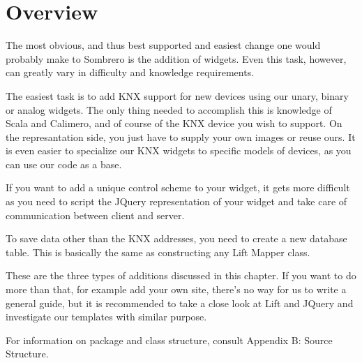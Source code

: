 \section{Overview}

The most obvious, and thus best supported and easiest change one would probably make to Sombrero is the addition of widgets. Even this task, however, can greatly vary in difficulty and knowledge requirements.

The easiest task is to add KNX support for new devices using our unary, binary or analog widgets. The only thing needed to accomplish this is knowledge of Scala and Calimero, and of course of the KNX device you wish to support. On the represantation side, you just have to supply your own images or reuse ours. It is even easier to specialize our KNX widgets to specific models of devices, as you can use our code as a base.

If you want to add a unique control scheme to your widget, it gets more difficult as you need to script the JQuery representation of your widget and take care of communication between client and server.

To save data other than the KNX addresses, you need to create a new database table. This is basically the same as constructing any Lift Mapper class.

These are the three types of additions discussed in this chapter. If you want to do more than that, for example add your own site, there's no way for us to write a general guide, but it is recommended to take a close look at Lift and JQuery and investigate our templates with similar purpose.

For information on package and class structure, consult Appendix B: Source Structure.
